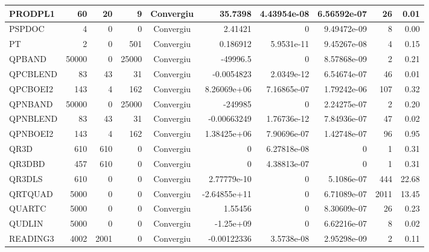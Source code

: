 \begin{center}
\begin{longtable}{|l|r|r|r|c|r|r|r|r|r|}
 PRODPL1 &     60 &     20 &      9 & Convergiu  &     35.7398 &    4.43954e-08 & 6.56592e-07 &     26 &    0.01 \\ \hline
  PSPDOC &      4 &      0 &      0 & Convergiu  &     2.41421 &              0 & 9.49472e-09 &      8 &    0.00 \\ \hline
      PT &      2 &      0 &    501 & Convergiu  &    0.186912 &     5.9531e-11 & 9.45267e-08 &      4 &    0.15 \\ \hline
  QPBAND &  50000 &      0 &  25000 & Convergiu  &    -49996.5 &              0 & 8.57868e-09 &      2 &    0.21 \\ \hline
QPCBLEND &     83 &     43 &     31 & Convergiu  &  -0.0054823 &     2.0349e-12 & 6.54674e-07 &     46 &    0.01 \\ \hline
QPCBOEI2 &    143 &      4 &    162 & Convergiu  & 8.26069e+06 &    7.16865e-07 & 1.79242e-06 &    107 &    0.32 \\ \hline
 QPNBAND &  50000 &      0 &  25000 & Convergiu  &     -249985 &              0 & 2.24275e-07 &      2 &    0.20 \\ \hline
QPNBLEND &     83 &     43 &     31 & Convergiu  & -0.00663249 &    1.76736e-12 & 7.84936e-07 &     47 &    0.02 \\ \hline
QPNBOEI2 &    143 &      4 &    162 & Convergiu  & 1.38425e+06 &    7.90696e-07 & 1.42748e-07 &     96 &    0.95 \\ \hline
    QR3D &    610 &    610 &      0 & Convergiu  &           0 &    6.27818e-08 &           0 &      1 &    0.31 \\ \hline
  QR3DBD &    457 &    610 &      0 & Convergiu  &           0 &    4.38813e-07 &           0 &      1 &    0.31 \\ \hline
  QR3DLS &    610 &      0 &      0 & Convergiu  & 2.77779e-10 &              0 &  5.1086e-07 &    444 &   22.68 \\ \hline
 QRTQUAD &   5000 &      0 &      0 & Convergiu  & -2.64855e+11 &              0 & 6.71089e-07 &   2011 &   13.45 \\ \hline
  QUARTC &   5000 &      0 &      0 & Convergiu  &     1.55456 &              0 & 8.30609e-07 &     26 &    0.23 \\ \hline
  QUDLIN &   5000 &      0 &      0 & Convergiu  &   -1.25e+09 &              0 & 6.62216e-07 &      8 &    0.02 \\ \hline
READING3 &   4002 &   2001 &      0 & Convergiu  & -0.00122336 &     3.5738e-08 & 2.95298e-09 &      2 &    0.11 \\ \hline

\end{longtable}
\end{center}
